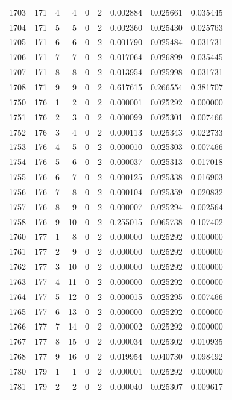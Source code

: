 \begin{longtable}{rrrrrrrrr}
1703 & 171 & 4 & 4 & 0 & 2 & 0.002884 & 0.025661 & 0.035445 \\
1704 & 171 & 5 & 5 & 0 & 2 & 0.002360 & 0.025430 & 0.025763 \\
1705 & 171 & 6 & 6 & 0 & 2 & 0.001790 & 0.025484 & 0.031731 \\
1706 & 171 & 7 & 7 & 0 & 2 & 0.017064 & 0.026899 & 0.035445 \\
1707 & 171 & 8 & 8 & 0 & 2 & 0.013954 & 0.025998 & 0.031731 \\
1708 & 171 & 9 & 9 & 0 & 2 & 0.617615 & 0.266554 & 0.381707 \\
1750 & 176 & 1 & 2 & 0 & 2 & 0.000001 & 0.025292 & 0.000000 \\
1751 & 176 & 2 & 3 & 0 & 2 & 0.000099 & 0.025301 & 0.007466 \\
1752 & 176 & 3 & 4 & 0 & 2 & 0.000113 & 0.025343 & 0.022733 \\
1753 & 176 & 4 & 5 & 0 & 2 & 0.000010 & 0.025303 & 0.007466 \\
1754 & 176 & 5 & 6 & 0 & 2 & 0.000037 & 0.025313 & 0.017018 \\
1755 & 176 & 6 & 7 & 0 & 2 & 0.000125 & 0.025338 & 0.016903 \\
1756 & 176 & 7 & 8 & 0 & 2 & 0.000104 & 0.025359 & 0.020832 \\
1757 & 176 & 8 & 9 & 0 & 2 & 0.000007 & 0.025294 & 0.002564 \\
1758 & 176 & 9 & 10 & 0 & 2 & 0.255015 & 0.065738 & 0.107402 \\
1760 & 177 & 1 & 8 & 0 & 2 & 0.000000 & 0.025292 & 0.000000 \\
1761 & 177 & 2 & 9 & 0 & 2 & 0.000000 & 0.025292 & 0.000000 \\
1762 & 177 & 3 & 10 & 0 & 2 & 0.000000 & 0.025292 & 0.000000 \\
1763 & 177 & 4 & 11 & 0 & 2 & 0.000000 & 0.025292 & 0.000000 \\
1764 & 177 & 5 & 12 & 0 & 2 & 0.000015 & 0.025295 & 0.007466 \\
1765 & 177 & 6 & 13 & 0 & 2 & 0.000000 & 0.025292 & 0.000000 \\
1766 & 177 & 7 & 14 & 0 & 2 & 0.000002 & 0.025292 & 0.000000 \\
1767 & 177 & 8 & 15 & 0 & 2 & 0.000034 & 0.025302 & 0.010935 \\
1768 & 177 & 9 & 16 & 0 & 2 & 0.019954 & 0.040730 & 0.098492 \\
1780 & 179 & 1 & 1 & 0 & 2 & 0.000001 & 0.025292 & 0.000000 \\
1781 & 179 & 2 & 2 & 0 & 2 & 0.000040 & 0.025307 & 0.009617 \\

\end{longtable}
